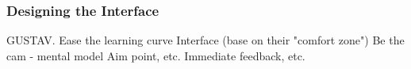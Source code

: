 \subsubsection{Designing the Interface}
GUSTAV. Ease the learning curve
Interface (base on their "comfort zone")
Be the cam - mental model
Aim point, etc.
Immediate feedback, etc.